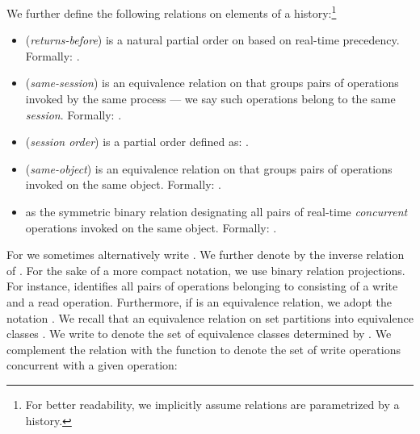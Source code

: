 \documentclass[letter, 11pt]{article}
\begin{document}
We further define the following relations on elements of a history:\footnote{For better readability, we implicitly assume relations are parametrized by a history.}  
\begin{itemize}
\item  (\emph{returns-before}) is a natural partial order on  based on real-time precedency.
Formally: .
\item  (\emph{same-session}) is an equivalence relation on  that groups pairs of operations invoked by the same process --- we say such operations belong to the same \emph{session}. Formally: .
\item   (\emph{session order}) is a partial order defined as: .
\item  (\emph{same-object}) is an equivalence relation on  that groups pairs of operations invoked on the same object.
Formally: .
\item   as the symmetric binary relation designating all pairs of real-time \emph{concurrent} operations invoked on the same object. Formally: 
.
\end{itemize} 
For  we sometimes alternatively write . We further denote by  the inverse relation of . For the sake of a more compact notation, we use binary relation projections.
For instance,  identifies all pairs of operations belonging to  
consisting of a write and a read operation.
Furthermore, if  is an equivalence relation, we adopt the notation
.
We recall that an equivalence relation  on set  partitions  into equivalence classes
. We write  to denote the set of equivalence classes determined by . 
We complement the  relation  with the function  to denote the set of write operations concurrent with a given operation:
\end{document}
